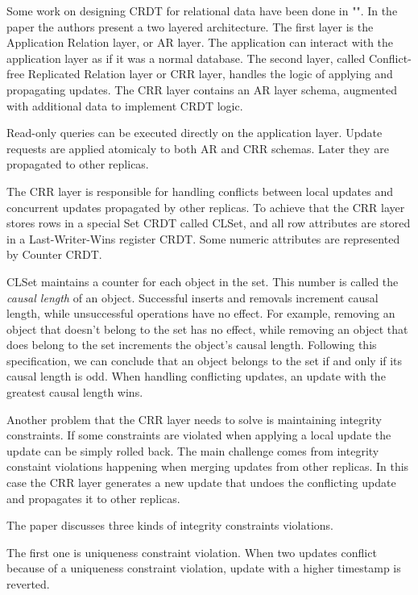 \documentclass[a4paper, 11pt, oneside]{article}
\theoremstyle{definition}
\begin{document}
Some work on designing CRDT for relational data have been done in ""\cite{relcrdt}. In the paper the authors present a two layered architecture. The first layer is the Application Relation layer, or AR layer. The application can interact with the application layer as if it was a normal database. The second layer, called Conflict-free Replicated Relation layer or CRR layer, handles the logic of applying and propagating updates. The CRR layer contains an AR layer schema, augmented with additional data to implement CRDT logic.

Read-only queries can be executed directly on the application layer. Update requests are applied atomicaly to both AR and CRR schemas. Later they are propagated to other replicas.

The CRR layer is responsible for handling conflicts between local updates and concurrent updates propagated by other replicas. To achieve that the CRR layer stores rows in a special Set CRDT called CLSet, and all row attributes are stored in a Last-Writer-Wins register CRDT. Some numeric attributes are represented by Counter CRDT.

CLSet maintains a counter for each object in the set. This number is called the \textit{causal length} of an object. Successful inserts and removals increment causal length, while unsuccessful operations have no effect. For example, removing an object that doesn't belong to the set has no effect, while removing an object that does belong to the set increments the object's causal length. Following this specification, we can conclude that an object belongs to the set if and only if its causal length is odd. When handling conflicting updates, an update with the greatest causal length wins.

Another problem that the CRR layer needs to solve is maintaining integrity constraints. If some constraints are violated when applying a local update the update can be simply rolled back. The main challenge comes from integrity constaint violations happening when merging updates from other replicas. In this case the CRR layer generates a new update that undoes the conflicting update and propagates it to other replicas.

The paper discusses three kinds of integrity constraints violations. 

The first one is uniqueness constraint violation. When two updates conflict because of a uniqueness constraint violation, update with a higher timestamp is reverted. 
\end{document}
